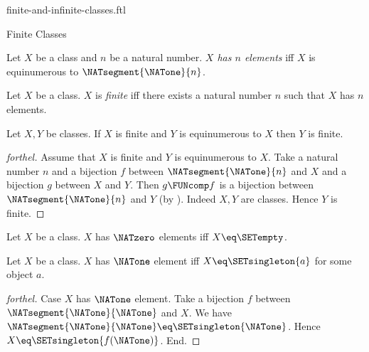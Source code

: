 \documentclass{naproche-library}
\begin{document}
\begin{smodule}[title=Finite and Infinite Classes]{finite-and-infinite-classes.ftl}

\begin{sfragment}{Finite Classes}
  \begin{definition}[forthel,id=FOUNDATIONS_14_3512046897512410]
    Let $X$ be a class and $n$ be a natural number.
    \emph{$X$ has $n$ elements} iff $X$ is equinumerous to $\NATsegment{\NATone}{n}$.
  \end{definition}

  \begin{definition}[forthel,id=FOUNDATIONS_14_3694156977274880]
    Let $X$ be a class.
    $X$ is \emph{finite} iff there exists a natural number $n$ such that $X$ has $n$ elements.
  \end{definition}

  \begin{proposition}[forthel,id=FOUNDATIONS_14_3929085203972096]
    Let $X, Y$ be classes.
    If $X$ is finite and $Y$ is equinumerous to $X$ then $Y$ is finite.
  \end{proposition}
  \begin{proof}[forthel]
    Assume that $X$ is finite and $Y$ is equinumerous to $X$.
    Take a natural number $n$ and a bijection $f$ between $\NATsegment{\NATone}{n}$ and $X$ and a bijection $g$ between $X$ and $Y$.
    Then $g \FUNcomp f$ is a bijection between $\NATsegment{\NATone}{n}$ and $Y$ (by ).
    Indeed $X, Y$ are classes.
    Hence $Y$ is finite.
  \end{proof}

  \begin{proposition}[forthel,id=FOUNDATIONS_14_5132547854597502]
    Let $X$ be a class.
    $X$ has $\NATzero$ elements iff $X \eq \SETempty$.
  \end{proposition}

  \begin{proposition}[forthel,id=FOUNDATIONS_14_6812054297034125]
    Let $X$ be a class.
    $X$ has $\NATone$ element iff $X \eq \SETsingleton{a}$ for some object $a$.
  \end{proposition}
  \begin{proof}[forthel]
    Case $X$ has $\NATone$ element.
      Take a bijection $f$ between $\NATsegment{\NATone}{\NATone}$ and $X$.
      We have $\NATsegment{\NATone}{\NATone} \eq \SETsingleton{\NATone}$.
      Hence $X \eq \SETsingleton{f(\NATone)}$.
    End.


\end{proof}
\end{sfragment}
\end{smodule}
\end{document}
